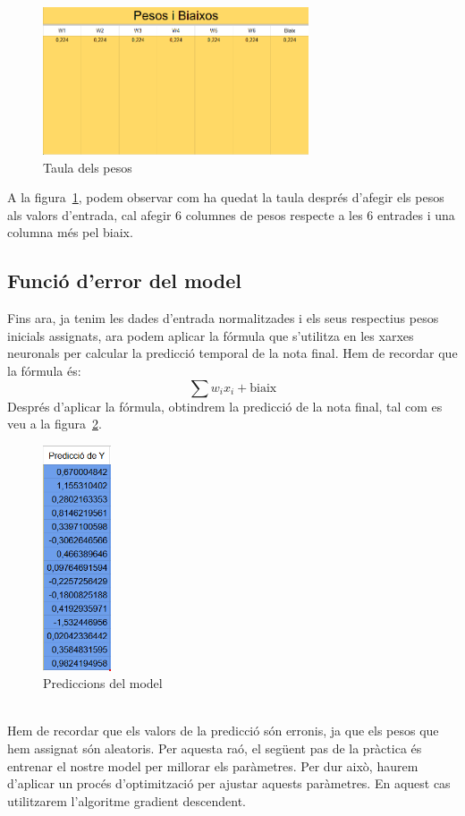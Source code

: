 \begin{figure}[h!]
    \centering
    \includegraphics[width=0.7\textwidth]{./figures/Pesos.png}
    \caption{Taula dels pesos}
    \label{f:pesos}
\end{figure}

A la figura~\ref{f:pesos}, podem observar com ha quedat la taula després d'afegir els pesos als valors d'entrada, cal afegir 6 columnes de pesos respecte a les 6 entrades i una columna més pel biaix.

\subsection{Funció d'error del model}
Fins ara, ja tenim les dades d'entrada normalitzades i els seus respectius pesos inicials assignats, ara podem aplicar la fórmula que s'utilitza en les xarxes neuronals per calcular la predicció temporal de la nota final. Hem de recordar que la fórmula és:
$$\sum w_i x_i + \text{biaix}$$
Després d'aplicar la fórmula, obtindrem la predicció de la nota final, tal com es veu a la figura~\ref{f:Predicciones}.
\begin{figure}[h!]
    \centering
    \includegraphics[width=0.18\textwidth]{./figures/Predicciones.png}
    \caption{Prediccions del model}
    \label{f:Predicciones}
 \end{figure}
\\Hem de recordar que els valors de la predicció són erronis, ja que els pesos que hem assignat són aleatoris. Per aquesta raó, el següent pas de la pràctica és entrenar el nostre model per millorar els paràmetres. Per dur això, haurem d'aplicar un procés d'optimització per ajustar aquests paràmetres. En aquest cas utilitzarem l'algoritme gradient descendent.

